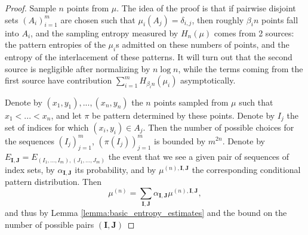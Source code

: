 \documentclass[11pt]{article}
\theoremstyle{definition}
\begin{document}
\begin{proof}
    Sample $n$ points from $\mu$. The idea of the proof is that if pairwise disjoint sets $(A_i)_{i=1}^m$ are chosen such that $\mu_i(A_j)=\delta_{i, j}$, then roughly $\beta_i n$ points fall into $A_i$, and the sampling entropy measured by $H_n(\mu)$ comes from 2 sources: the pattern entropies of the $\mu_i$s admitted on these numbers of points, and the entropy of the interlacement of these patterns. It will turn out that the second source is negligible after normalizing by $n\log n$, while the terms coming from the first source have contribution $\sum_{i=1}^m H_{\beta_i n}(\mu_i)$ asymptotically.

    Denote by $(x_1, y_1), ..., (x_n, y_n)$ the $n$ points sampled from $\mu$ such that $x_1< ... < x_n$, and let $\pi$ be pattern determined by these points. Denote by $I_j$ the set of indices for which $(x_i, y_i)\in A_j$. Then the number of possible choices for the sequences $(I_j)_{j=1}^m$, $(\pi(I_j))_{j=1}^m$ is bounded by $m^{2n}$. Denote by $E_{\mathbf{I}, \mathbf{J}} = E_{(I_1, ..., I_m), (J_1, ..., J_m)}$ the event that we see a given pair of sequences of index sets, by $\alpha_{\mathbf{I}, \mathbf{J}}$ its probability, and by $\mu^{(n), \mathbf{I}, \mathbf{J}}$ the corresponding conditional pattern distribution. Then 
    $$\mu^{(n)} = \sum_{\mathbf{I}, \mathbf{J}}\alpha_{\mathbf{I}, \mathbf{J}}\mu^{(n), \mathbf{I}, \mathbf{J}},$$
    and thus by Lemma \ref{lemma:basic_entropy_estimates} and the bound on the number of possible pairs $(\mathbf{I}, \mathbf{J})$


\end{proof}
\end{document}
